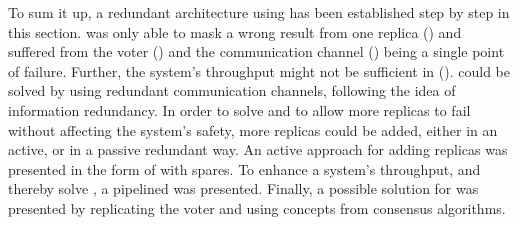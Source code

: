 To sum it up, a redundant architecture using  has been established step by step in this section.
 was only able to mask a wrong result from one replica (\ChallengeWR) and suffered from the voter (\ChallengeVoter) and the communication channel (\ChallengeComm) being a single point of failure.
Further, the system's throughput might not be sufficient in  (\ChallengeThrough).
\ChallengeComm could be solved by using redundant communication channels, following the idea of information redundancy.
In order to solve \ChallengeWR and to allow more replicas to fail without affecting the system's safety, more replicas could be added, either in an active, or in a passive redundant way.
An active approach for adding replicas was presented in the form of  with spares.
To enhance a system's throughput, and thereby solve \ChallengeThrough, a pipelined  was presented.
Finally, a possible solution for \ChallengeVoter was presented by replicating the voter and using concepts from consensus algorithms.